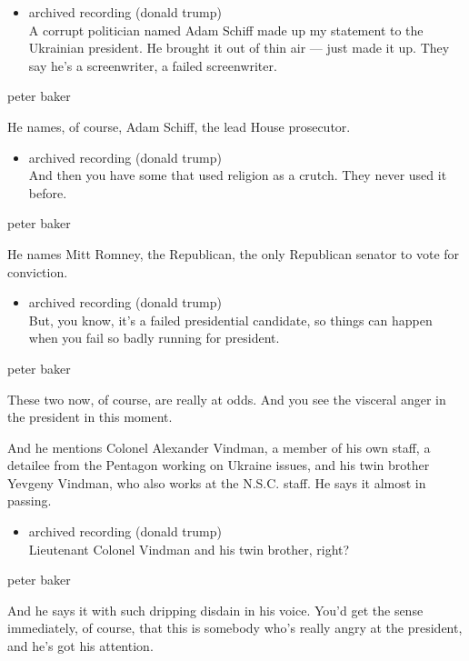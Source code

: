 \begin{itemize}
\tightlist
\item
  archived recording (donald trump)\\
  A corrupt politician named Adam Schiff made up my statement to the
  Ukrainian president. He brought it out of thin air --- just made it
  up. They say he's a screenwriter, a failed screenwriter.
\end{itemize}

peter baker

He names, of course, Adam Schiff, the lead House prosecutor.

\begin{itemize}
\tightlist
\item
  archived recording (donald trump)\\
  And then you have some that used religion as a crutch. They never used
  it before.
\end{itemize}

peter baker

He names Mitt Romney, the Republican, the only Republican senator to
vote for conviction.

\begin{itemize}
\tightlist
\item
  archived recording (donald trump)\\
  But, you know, it's a failed presidential candidate, so things can
  happen when you fail so badly running for president.
\end{itemize}

peter baker

These two now, of course, are really at odds. And you see the visceral
anger in the president in this moment.

And he mentions Colonel Alexander Vindman, a member of his own staff, a
detailee from the Pentagon working on Ukraine issues, and his twin
brother Yevgeny Vindman, who also works at the N.S.C. staff. He says it
almost in passing.

\begin{itemize}
\tightlist
\item
  archived recording (donald trump)\\
  Lieutenant Colonel Vindman and his twin brother, right?
\end{itemize}

peter baker

And he says it with such dripping disdain in his voice. You'd get the
sense immediately, of course, that this is somebody who's really angry
at the president, and he's got his attention.

